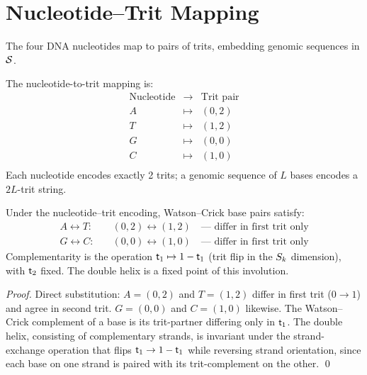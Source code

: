 \section{Nucleotide--Trit Mapping}
\label{sec:nucleotide_trit}

The four DNA nucleotides map to pairs of trits, embedding genomic sequences
in $\mathcal{S}$.

\begin{definition}
\label{def:nt_trit}
The nucleotide-to-trit mapping is:
\begin{equation}
  \begin{array}{ccc}
    \text{Nucleotide} & \to & \text{Trit pair} \\
    \hline
    A & \mapsto & (0, 2) \\
    T & \mapsto & (1, 2) \\
    G & \mapsto & (0, 0) \\
    C & \mapsto & (1, 0) \\
  \end{array}
  \label{eq:nt_trit_map}
\end{equation}
Each nucleotide encodes exactly 2 trits; a genomic sequence of $L$ bases
encodes a $2L$-trit string.
\end{definition}

\begin{proposition}
\label{prop:wc_trit}
Under the nucleotide--trit encoding, Watson--Crick base pairs satisfy:
\begin{align}
  A \leftrightarrow T: & \quad (0,2) \leftrightarrow (1,2) \quad \text{--- differ in first trit only} \\
  G \leftrightarrow C: & \quad (0,0) \leftrightarrow (1,0) \quad \text{--- differ in first trit only}
\end{align}
Complementarity is the operation $\mathsf{t}_1 \mapsto 1 - \mathsf{t}_1$ (trit flip in
the $S_k$ dimension), with $\mathsf{t}_2$ fixed. The double helix is a fixed point
of this involution.
\end{proposition}

\begin{proof}
Direct substitution: $A=(0,2)$ and $T=(1,2)$ differ in first trit
($0 \to 1$) and agree in second trit. $G=(0,0)$ and $C=(1,0)$ likewise.
The Watson--Crick complement of a base is its trit-partner differing only
in $\mathsf{t}_1$. The double helix, consisting of complementary strands, is
invariant under the strand-exchange operation that flips $\mathsf{t}_1 \to 1-\mathsf{t}_1$
while reversing strand orientation, since each base on one strand is paired
with its trit-complement on the other. \qed
\end{proof}

